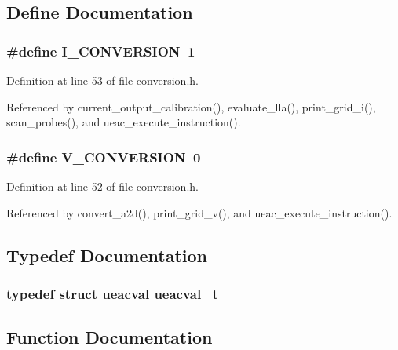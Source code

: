 \subsection{Define Documentation}
\subsubsection{\setlength{\rightskip}{0pt plus 5cm}\#define I\_\-CONVERSION~1}\label{conversion_8h_a1}




Definition at line 53 of file conversion.h.

Referenced by current\_\-output\_\-calibration(), evaluate\_\-lla(), print\_\-grid\_\-i(), scan\_\-probes(), and ueac\_\-execute\_\-instruction().
\subsubsection{\setlength{\rightskip}{0pt plus 5cm}\#define V\_\-CONVERSION~0}\label{conversion_8h_a0}




Definition at line 52 of file conversion.h.

Referenced by convert\_\-a2d(), print\_\-grid\_\-v(), and ueac\_\-execute\_\-instruction().

\subsection{Typedef Documentation}
\subsubsection{\setlength{\rightskip}{0pt plus 5cm}typedef struct {\bf ueacval}  {\bf ueacval\_\-t}}\label{conversion_8h_a2}




\subsection{Function Documentation}
